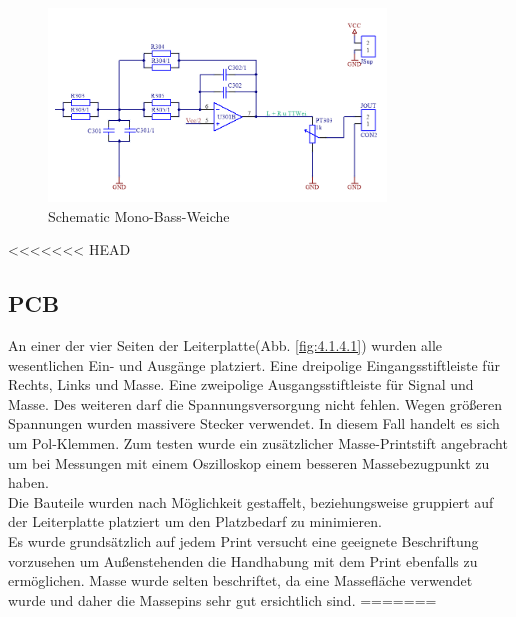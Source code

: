 \begin{figure} [H]
	\centering
	\includegraphics[width=0.8\textwidth]{img/Print3/3mTTWeicheruAddiererDiplSchematicTeil2.png}
	\caption{Schematic Mono-Bass-Weiche}
	\label {fig:4.1.3.3}
\end{figure}

<<<<<<< HEAD
\subsection{PCB}\label{subsec:4.1.4}
An einer der vier Seiten der Leiterplatte(Abb. \ref{fig:4.1.4.1}) wurden alle wesentlichen Ein- und Ausgänge platziert. Eine dreipolige Eingangsstiftleiste für Rechts, Links und Masse. Eine zweipolige Ausgangsstiftleiste für Signal und Masse. Des weiteren darf die Spannungsversorgung nicht fehlen. Wegen größeren Spannungen wurden massivere Stecker verwendet. In diesem Fall handelt es sich um Pol-Klemmen. Zum testen wurde ein zusätzlicher Masse-Printstift angebracht um bei Messungen mit einem Oszilloskop einem besseren Massebezugpunkt zu haben.\\
Die Bauteile wurden nach Möglichkeit gestaffelt, beziehungsweise gruppiert auf der Leiterplatte platziert um den Platzbedarf zu minimieren.\\
Es wurde grundsätzlich auf jedem Print versucht eine geeignete Beschriftung vorzusehen um Außenstehenden die Handhabung mit dem Print ebenfalls zu ermöglichen. Masse wurde selten beschriftet, da eine Massefläche verwendet wurde und daher die Massepins sehr gut ersichtlich sind.
=======
